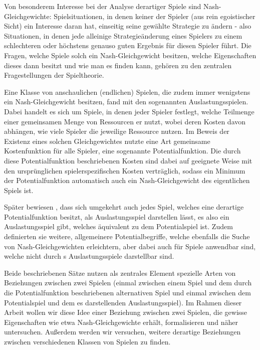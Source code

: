 \documentclass[a4paper,ngerman,11pt,bibliography=totoc]{scrartcl}
\theoremstyle{definition}
\theoremstyle{plain}
\theoremstyle{remark}
\begin{document}
Von besonderem Interesse bei der Analyse derartiger Spiele sind Nash-Gleichgewichte: Spielsituationen, in denen keiner der Spieler (aus rein egoistischer Sicht) ein Interesse daran hat, einseitig seine gewählte Strategie zu ändern - also Situationen, in denen jede alleinige Strategieänderung eines Spielers zu einem schlechteren oder höchstens genauso guten Ergebnis für diesen Spieler führt. Die Fragen, welche Spiele solch ein Nash-Gleichgewicht besitzen, welche Eigenschaften dieses dann besitzt und wie man es finden kann, gehören zu den zentralen Fragestellungen der Spieltheorie.

Eine Klasse von anschaulichen (endlichen) Spielen, die zudem immer wenigstens ein Nash-Gleichgewicht besitzen, fand \citeauthor{RosenthalPotential} mit den sogenannten Auslastungsspielen. Dabei handelt es sich um Spiele, in denen jeder Spieler festlegt, welche Teilmenge einer gemeinsamen Menge von Ressourcen er nutzt, wobei deren Kosten davon abhängen, wie viele Spieler die jeweilige Ressource nutzen. Im Beweis der Existenz eines solchen Gleichgewichtes nutzte \citeauthor{RosenthalPotential} eine Art gemeinsame Kostenfunktion für alle Spieler, eine sogenannte Potentialfunktion. Die durch diese Potentialfunktion beschriebenen Kosten sind dabei auf geeignete Weise mit den ursprünglichen spielerspezifischen Kosten verträglich, sodass ein Minimum der Potentialfunktion automatisch auch ein Nash-Gleichgewicht des eigentlichen Spiels ist.

Später bewiesen \citeauthor{MonShap}, dass sich umgekehrt auch jedes Spiel, welches eine derartige Potentialfunktion besitzt, als Auslastungsspiel darstellen lässt, es also ein Auslastungsspiel gibt, welches äquivalent zu dem Potentialspiel ist. Zudem definierten sie weitere, allgemeinere Potentialbegriffe, welche ebenfalls die Suche von Nash-Gleichgewichten erleichtern, aber dabei auch für Spiele anwendbar sind, welche nicht durch \citeauthor{RosenthalPotential}s Auslastungsspiele darstellbar sind. 

Beide beschriebenen Sätze nutzen als zentrales Element spezielle Arten von Beziehungen zwischen zwei Spielen (einmal zwischen einem Spiel und dem durch die Potentialfunktion beschriebenen alternativen Spiel und einmal zwischen dem Potentialspiel und dem es darstellenden Auslastungsspiel). Im Rahmen dieser Arbeit wollen wir diese Idee einer Beziehung zwischen zwei Spielen, die gewisse Eigenschaften wie etwa Nash-Gleichgewichte erhält, formalisieren und näher untersuchen. Außerdem werden wir versuchen, weitere derartige Beziehungen zwischen verschiedenen Klassen von Spielen zu finden.
\end{document}

